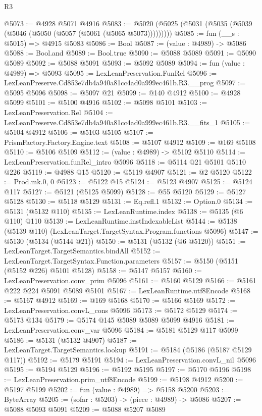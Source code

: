 \begin{lexlean}{R3}
\begin{coremodule}
@5073 := @4928 @5071 @4916
@5083 := @5020 (@5025 (@5031 (@5035 (@5039 (@5046 (@5050 (@5057 (@5061 (@5065 @5073)))))))))
@5085 := fun (__s : @5015) => @4915 @5083
@5086 := Bool
@5087 := (value : @4989) -> @5086
@5088 := Bool.and
@5089 := Bool.true
@5090 := @5088 @5089
@5091 := @5090 @5089
@5092 := @5088 @5091
@5093 := @5092 @5089
@5094 := fun (value : @4989) => @5093
@5095 := LexLeanPreservation.FunRel
@5096 := LexLeanPreserve.Cd853e7db4a940a81cc4ad0a999ec461b.R3.__prog
@5097 := @5095 @5096
@5098 := @5097 @21
@5099 := @140 @4912
@5100 := @4928 @5099
@5101 := @5100 @4916
@5102 := @5098 @5101
@5103 := LexLeanPreservation.Rel
@5104 := LexLeanPreserve.Cd853e7db4a940a81cc4ad0a999ec461b.R3.__fits_1
@5105 := @5104 @4912
@5106 := @5103 @5105
@5107 := PrismFactory.Factory.Engine.text
@5108 := @5107 @4912
@5109 := @169 @5108
@5110 := @5106 @5109
@5112 := (value : @4989) -> @5102 @5110
@5114 := LexLeanPreservation.funRel_intro @5096
@5118 := @5114 @21 @5101 @5110 @226
@5119 := @4988 @15
@5120 := @5119 @4907
@5121 := @2 @5120
@5122 := Prod.mk.{0, 0}
@5123 := @5122 @15
@5124 := @5123 @4907
@5125 := @5124 @117
@5127 := @5121 (@5125 @5099)
@5128 := @55 @5120
@5129 := @5127 @5128
@5130 := @5118 @5129
@5131 := Eq.refl.{1}
@5132 := Option.{0}
@5134 := @5131 (@5132 @110)
@5135 := LexLeanRuntime.index
@5138 := @5135 (@6 @110) @110
@5139 := LexLeanRuntime.instIndexableList
@5144 := @5138 (@5139 @110) (LexLeanTarget.TargetSyntax.Program.functions @5096)
@5147 := @5130 (@5134 (@5144 @21))
@5150 := @5131 (@5132 (@6 @5120))
@5151 := LexLeanTarget.TargetSemantics.bindAll
@5152 := LexLeanTarget.TargetSyntax.Function.parameters
@5157 := @5150 (@5151 (@5152 @226) @5101 @5128)
@5158 := @5147 @5157
@5160 := LexLeanPreservation.conv_prim @5096
@5161 := @5160 @5129
@5166 := @5161 @222 @224 @5091 @5089 @5101
@5167 := LexLeanRuntime.utf8Encode
@5168 := @5167 @4912
@5169 := @169 @5168
@5170 := @5166 @5169
@5172 := LexLeanPreservation.convL_cons @5096
@5173 := @5172 @5129
@5174 := @5173 @134
@5179 := @5174 @145 @5089 @5089 @5099 @4916
@5181 := LexLeanPreservation.conv_var @5096
@5184 := @5181 @5129 @117 @5099
@5186 := @5131 (@5132 @4907)
@5187 := LexLeanTarget.TargetSemantics.lookup
@5191 := @5184 (@5186 (@5187 @5129 @117))
@5192 := @5179 @5191
@5194 := LexLeanPreservation.convL_nil @5096
@5195 := @5194 @5129
@5196 := @5192 @5195
@5197 := @5170 @5196
@5198 := LexLeanPreservation.prim_utf8Encode
@5199 := @5198 @4912
@5200 := @5197 @5199
@5202 := fun (value : @4989) => @5158 @5200
@5203 := ByteArray
@5205 := (sofar : @5203) -> (piece : @4989) -> @5086
@5207 := @5088 @5093 @5091
@5209 := @5088 @5207 @5089

\end{coremodule}
\end{lexlean}
